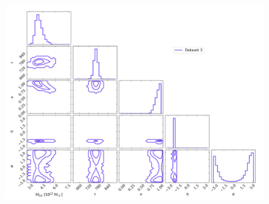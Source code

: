 \documentclass[twocolumn]{aastex631}
\begin{document}
\begin{figure}[htb]
  \centering
  \includegraphics[width=0.8\columnwidth]{analyze-runs-all-Dataset3.png}
  \caption{\label{fig:contour-dataset3}
  }
\end{figure}


{}

\end{document}

